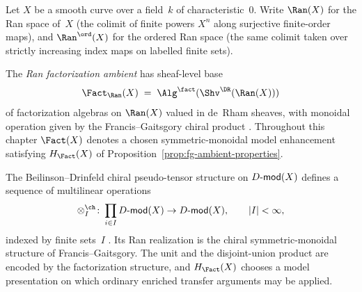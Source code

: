 Let $X$ be a smooth curve over a field~$k$ of characteristic~$0$.
Write $\Ran(X)$ for the Ran space of~$X$ (the colimit of finite powers
$X^n$ along surjective finite-order maps), and $\Ran^{\ord}(X)$ for the
ordered Ran space (the same colimit taken over strictly increasing
index maps on labelled finite sets).

\begin{definition}
\label{def:fg-ambient}
The \emph{Ran factorization ambient} has sheaf-level base
\[
\Fact_{\Ran}(X)
\;=\;
\Alg^{\fact}(\Shv^{\DR}(\Ran(X)))
\]
of factorization algebras on $\Ran(X)$ valued in de~Rham sheaves, with
monoidal operation given by the Francis--Gaitsgory chiral product
\cite{Francis2012}.  Throughout this chapter $\Fact(X)$ denotes a
chosen symmetric-monoidal model enhancement satisfying
$H_{\Fact}(X)$ of Proposition~\ref{prop:fg-ambient-properties}.
\end{definition}

\begin{remark}
\label{rem:why-fact}
The Beilinson--Drinfeld chiral pseudo-tensor structure on $D\text{-}\mathsf{mod}(X)$
defines a sequence of multilinear operations
\[
\otimes^{\ch}_I \colon \prod_{i\in I} \Dmod(X) \to \Dmod(X),\qquad
|I|<\infty,
\]
indexed by finite sets~$I$ \cite[\S3.4]{BD04}.  Its Ran realization is
the chiral symmetric-monoidal structure of Francis--Gaitsgory.  The
unit and the disjoint-union product are encoded by the factorization
structure, and $H_{\Fact}(X)$ chooses a model presentation on which
ordinary enriched transfer arguments may be applied.
\end{remark}

